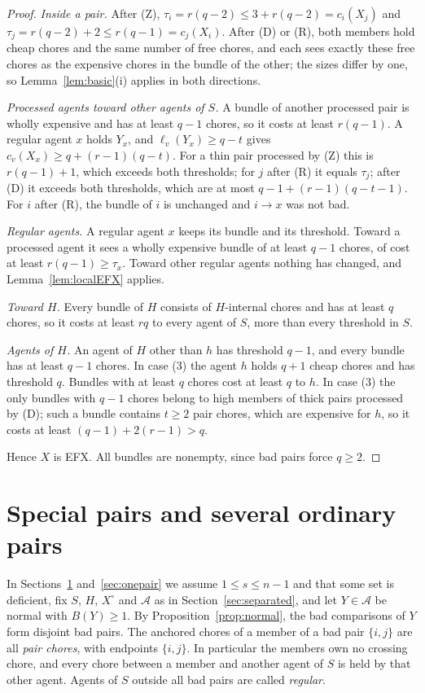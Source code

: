 \documentclass{amsart}
\numberwithin{equation}{section}
\theoremstyle{definition}
\theoremstyle{remark}
\newcommand{\cA}{\mathcal{A}}
\begin{document}
\begin{proof}
\emph{Inside a pair.} After (Z), $\tau_i=r(q-2)\le 3+r(q-2)=c_i(X_j)$ and $\tau_j=r(q-2)+2\le r(q-1)=c_j(X_i)$. After (D) or (R), both members hold cheap chores and the same number of free chores, and each sees exactly these free chores as the expensive chores in the bundle of the other; the sizes differ by one, so Lemma~\ref{lem:basic}(i) applies in both directions.

\emph{Processed agents toward other agents of $S$.} A bundle of another processed pair is wholly expensive and has at least $q-1$ chores, so it costs at least $r(q-1)$. A regular agent $x$ holds $Y_x$, and $\ell_v(Y_x)\ge q-t$ gives $c_v(X_x)\ge q+(r-1)(q-t)$. For a thin pair processed by (Z) this is $r(q-1)+1$, which exceeds both thresholds; for $j$ after (R) it equals $\tau_j$; after (D) it exceeds both thresholds, which are at most $q-1+(r-1)(q-t-1)$. For $i$ after (R), the bundle of $i$ is unchanged and $i\to x$ was not bad.

\emph{Regular agents.} A regular agent $x$ keeps its bundle and its threshold. Toward a processed agent it sees a wholly expensive bundle of at least $q-1$ chores, of cost at least $r(q-1)\ge\tau_x$. Toward other regular agents nothing has changed, and Lemma~\ref{lem:localEFX} applies.

\emph{Toward $H$.} Every bundle of $H$ consists of $H$-internal chores and has at least $q$ chores, so it costs at least $rq$ to every agent of $S$, more than every threshold in $S$.

\emph{Agents of $H$.} An agent of $H$ other than $h$ has threshold $q-1$, and every bundle has at least $q-1$ chores. In case (3) the agent $h$ holds $q+1$ cheap chores and has threshold $q$. Bundles with at least $q$ chores cost at least $q$ to $h$. In case (3) the only bundles with $q-1$ chores belong to high members of thick pairs processed by (D); such a bundle contains $t\ge2$ pair chores, which are expensive for $h$, so it costs at least $(q-1)+2(r-1)>q$.

Hence $X$ is EFX. All bundles are nonempty, since bad pairs force $q\ge2$.
\end{proof}

\section{Special pairs and several ordinary pairs}\label{sec:several}

In Sections~\ref{sec:several} and~\ref{sec:onepair} we assume $1\le s\le n-1$ and that some set is deficient, fix $S$, $H$, $X^\circ$ and $\cA$ as in Section~\ref{sec:separated}, and let $Y\in\cA$ be normal with $B(Y)\ge1$. By Proposition~\ref{prop:normal}, the bad comparisons of $Y$ form disjoint bad pairs. The anchored chores of a member of a bad pair $\{i,j\}$ are all \emph{pair chores}, with endpoints $\{i,j\}$. In particular the members own no crossing chore, and every chore between a member and another agent of $S$ is held by that other agent. Agents of $S$ outside all bad pairs are called \emph{regular}.
\end{document}
